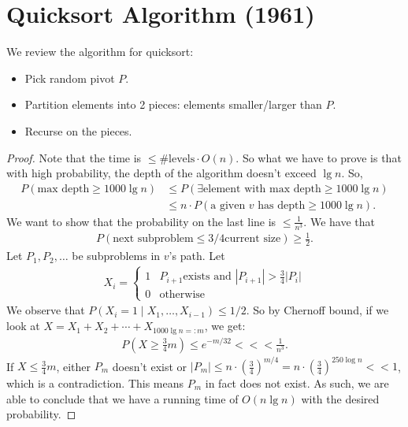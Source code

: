\documentclass{report}
\begin{document}
\section{Quicksort Algorithm (1961)}
We review the algorithm for quicksort:
\begin{itemize}
    \item Pick random pivot $P$.
    \item Partition elements into 2 pieces: elements smaller/larger than $P$.
    \item Recurse on the pieces.
\end{itemize}
\begin{proof}
    Note that the time is $\leq \#\text{levels} \cdot O(n)$. So what we have to prove is that with high probability, the depth of the algorithm doesn't exceed $\lg n$. So,
    \begin{align*}
        P(\text{max depth} \geq 1000\lg n) &\leq P(\exists \text{element with max depth} \geq 1000 \lg n) \\
        &\leq n \cdot P(\text{a given $v$ has depth} \geq 1000 \lg n).
    \end{align*}
    We want to show that the probability on the last line is $\leq \frac{1}{n^3}$. We have that
    \begin{align*}
        P(\text{next subproblem} \leq 3/4 \text{current size}) \geq \frac 12.
    \end{align*}
    Let $P_1, P_2, \ldots$ be subproblems in $v$'s path. Let 
    \begin{align*}
        X_i = \begin{cases}
            1 & P_{i+1} \text{exists and } |P_{i+1}| > \frac 34 |P_i| \\
            0 & \text{otherwise}
        \end{cases}
    \end{align*}
    We observe that $P(X_i = 1 \mid X_1, \ldots, X_{i-1}) \leq 1/2$. So by Chernoff bound, if we look at $X = X_1 + X_2  + \cdots + X_{1000 \lg n =: m}$, we get:
    \begin{align*}
        P\left( X \geq \frac 34 m\right) \leq e^{-m/32} <<< \frac{1}{n^3}.
    \end{align*}
    If $X \leq \frac 34 m$, either $P_m$ doesn't exist or $|P_m| \leq n \cdot \left( \frac 34 \right)^{m/4} = n \cdot \left( \frac 34 \right)^{250 \log n} << 1$, which is a contradiction. This means $P_m$ in fact does not exist. As such, we are able to conclude that we have a running time of $O(n \lg n)$ with the desired probability.
\end{proof}
\end{document}
